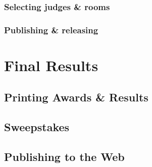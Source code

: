 \documentclass[12pt]{report}
\begin{document}
	\subsection{Selecting judges \& rooms}
	\subsection{Publishing \& releasing}

\chapter{Final Results} 

	\section{Printing Awards \& Results} 
	\section{Sweepstakes}
	\section{Publishing to the Web} 
	
\end{document}
